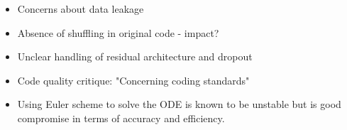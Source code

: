 \documentclass[landscape,a1paper,fontscale=0.424]{baposter}
\begin{document}
\begin{poster}
{\begin{minipage}[t]{0.48\textwidth}
\begin{itemize}
                \item Concerns about data leakage
                \item Absence of shuffling in original code - impact?
                \item Unclear handling of residual architecture and dropout
                \item Code quality critique: "Concerning coding standards"
                \item Using Euler scheme to solve the ODE is known to be unstable but is good compromise in terms of accuracy and efficiency.
            \end{itemize}
        \end{minipage}
    }
\end{poster}
\end{document}
